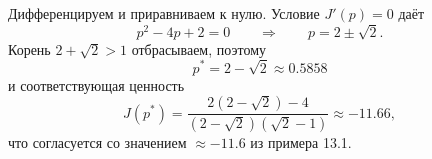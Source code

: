 \begin{solution}
    Дифференцируем и приравниваем к нулю. Условие $J'(p)=0$ даёт
    \begin{equation*}
        p^2 - 4p + 2 = 0
        \qquad\Longrightarrow\qquad
        p = 2 \pm \sqrt2 .
    \end{equation*}
    Корень $2+\sqrt2>1$ отбрасываем, поэтому
    \begin{equation*}
        \boxed{\;p^* = 2-\sqrt2 \approx 0.5858\;}
    \end{equation*}
    и соответствующая ценность
    \begin{equation*}
        J(p^*) = \frac{2(2-\sqrt2)-4}{(2-\sqrt2)(\sqrt2-1)} \approx -11.66,
    \end{equation*}
    что согласуется со значением $\approx -11.6$ из примера 13.1.
\end{solution}

